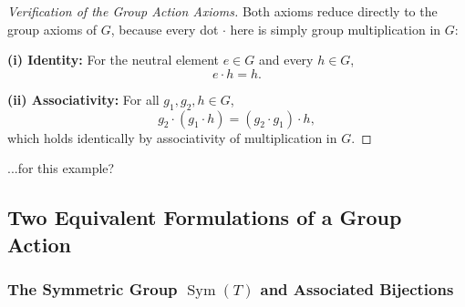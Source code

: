\begin{content}

\begin{proof}[Verification of the Group Action Axioms]
Both axioms reduce directly to the group axioms of $G$, because every dot $\cdot$ here is simply group multiplication in $G$:

\textbf{(i) Identity:} For the neutral element $e \in G$ and every $h \in G$,
\[
e \cdot h = h.
\]

\textbf{(ii) Associativity:} For all $g_1, g_2, h \in G$,
\[
g_2 \cdot (g_1 \cdot h) = (g_2 \cdot g_1) \cdot h,
\]
which holds identically by associativity of multiplication in $G$.
\end{proof}
\end{content}

\begin{student}
 ...for this example?
\end{student}

\subsection{Two Equivalent Formulations of a Group Action}

\subsubsection{The Symmetric Group \texorpdfstring{$\operatorname{Sym}(T)$}{Sym(T)} and Associated Bijections}

